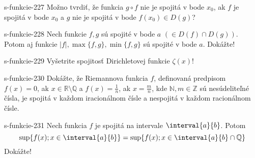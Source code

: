 \begin{defproblem}{s-funkcie-227}
Možno tvrdiť, že funkcia $g \circ f$ nie je spojitá v bode $x_{0}$, ak $f$ je
spojitá v bode $x_{0}$ a $g$ nie je spojitá v bode $f(x_0) \in D(g)$?
\end{defproblem}

\begin{defproblem}{s-funkcie-228}
Nech funkcie $f,g$ sú spojité v bode $a$ $(\in D(f)\cap D(g))$. Potom aj funkcie
$|f|,\max \{f,g\},\min \{f,g\}$ sú spojité v bode $a$. Dokážte!
\end{defproblem}

\begin{defproblem}{s-funkcie-229}
Vyšetrite spojitosť Dirichletovej funkcie $\zeta (x)$!
\end{defproblem}

\begin{defproblem}{s-funkcie-230}
Dokážte, že Riemannova funkcia $f$, definovaná predpisom $f(x)=0$, ak $x \in
\mathbb{R} \setminus \mathbb{Q}$ a $f(x)=\frac{1}{n}$, ak $x=\frac{m}{n}$, kde
$\mathbb{N}, m \in \mathbb{Z}$ sú nesúdeliteľné čísla, je spojitá v každom
iracionálnom čísle a nespojitá v každom racionálnom čísle.
\end{defproblem}

\begin{defproblem}{s-funkcie-231}
Nech funkcia $f$ je spojitá na intervale $\interval{a}{b}$. Potom
\[
  \sup \{f(x); x \in \interval{a}{b}\}= \sup \{f(x);
  x \in \interval{a}{b} \cap \mathbb{Q}\}
\]
Dokážte!
\end{defproblem}

